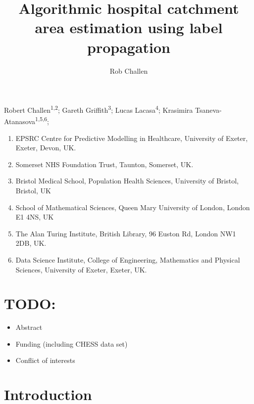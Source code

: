 \documentclass[
]{article}
\title{Algorithmic hospital catchment area estimation using label propagation}
\author{Rob Challen}
\date{}
\providecommand{\tightlist}{%
  \setlength{\itemsep}{0pt}\setlength{\parskip}{0pt}}
\begin{document}
\maketitle

Robert Challen\textsuperscript{1,2}; Gareth Griffith\textsuperscript{3};
Lucas Lacasa\textsuperscript{4}; Krasimira
Tsaneva-Atanasova\textsuperscript{1,5,6};

\begin{enumerate}
\def\labelenumi{\arabic{enumi})}
\tightlist
\item
  EPSRC Centre for Predictive Modelling in Healthcare, University of
  Exeter, Exeter, Devon, UK.
\item
  Somerset NHS Foundation Trust, Taunton, Somerset, UK.
\item
  Bristol Medical School, Population Health Sciences, University of
  Bristol, Bristol, UK
\item
  School of Mathematical Sciences, Queen Mary University of London,
  London E1 4NS, UK
\item
  The Alan Turing Institute, British Library, 96 Euston Rd, London NW1
  2DB, UK.
\item
  Data Science Institute, College of Engineering, Mathematics and
  Physical Sciences, University of Exeter, Exeter, UK.
\end{enumerate}

\hypertarget{todo}{%
\section{TODO:}\label{todo}}

\begin{itemize}
\tightlist
\item
  Abstract
\item
  Funding (including CHESS data set)
\item
  Conflict of interests
\end{itemize}

\hypertarget{introduction}{%
\section{Introduction}\label{introduction}}
\end{document}
